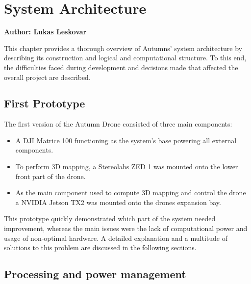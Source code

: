 \chapter{System Architecture}
\label{chapter:architecture}

\textbf{Author: Lukas Leskovar} 

This chapter provides a thorough overview of Autumns' system architecture by describing its construction and logical and computational structure. To this end, the difficulties faced during development and decisions made that affected the overall project are described.

\section{First Prototype}
The first version of the Autumn Drone consisted of three main components:
\begin{itemize}
	\item A DJI Matrice 100 functioning as the system's base powering all external components.
	\item To perform 3D mapping, a Stereolabs ZED 1 was mounted onto the lower front part of the drone.
	\item As the main component used to compute 3D mapping and control the drone a NVIDIA Jetson TX2 was mounted onto the drones expansion bay.
\end{itemize}
This prototype quickly demonstrated which part of the system needed improvement, whereas the main issues were the lack of computational power and usage of non-optimal hardware. A detailed explanation and a multitude of solutions to this problem are discussed in the following sections.


\section{Processing and power management}


